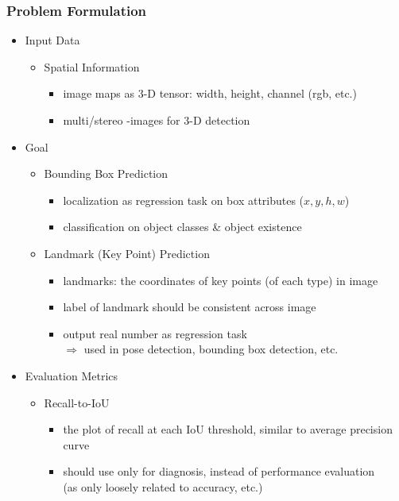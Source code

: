 \subsubsection{Problem Formulation}
\begin{itemize}
\item Input Data
	\begin{itemize}
	\item Spatial Information
		\begin{itemize}
		\item image maps as $3$-D tensor: width, height, channel (rgb, etc.)
		\item multi/stereo -images for $3$-D detection
		\end{itemize}
	\end{itemize}

\item Goal
	\begin{itemize}
	\item Bounding Box Prediction
		\begin{itemize}
		\item localization as regression task on box attributes ($x,y,h,w$)
		\item classification on object classes \& object existence
		\end{itemize}
	\item Landmark (Key Point) Prediction
		\begin{itemize}
		\item landmarks: the coordinates of key points (of  each type) in image
		\item label of landmark should be consistent across image
		\item output real number as regression task \\
		$\Rightarrow$ used in pose detection, bounding box detection, etc.
		\end{itemize}
	\end{itemize}

\item Evaluation Metrics
	\begin{itemize}
	\item Recall-to-IoU
		\begin{itemize}
		\item the plot of recall at each IoU threshold, similar to average precision curve
		\item should use only for diagnosis, instead of performance evaluation \\
		(as only loosely related to accuracy, etc.)
		\end{itemize}
	\end{itemize}


\end{itemize}
